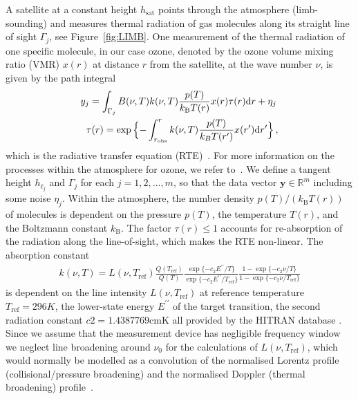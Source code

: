 A satellite at a constant height $h_{\text{sat}}$ points through the atmosphere (limb-sounding) and measures thermal radiation of gas molecules along its straight line of sight $\Gamma_j$, see  Figure~\ref{fig:LIMB}.
One measurement of the thermal radiation of one specific molecule, in our case ozone, denoted by the ozone volume mixing ratio (VMR) $x(r)$ at distance $r$ from the satellite, at the wave number $\nu$, is given by the path integral
\begin{align}
	\label{eq:RTE} 
	y_j =   \int_{\Gamma_j}  B(\nu,T) k(\nu, T)   \frac{p(T)}{k_{\text{B}} T(r)}  x(r)  \tau(r) \text{d}r + \eta_j \, \\
	\tau(r) = \exp{ \Bigl\{ - \int^{r}_{r_\text{obs}}  k(\nu, T)   \frac{p(T)}{k_B T(r^{\prime})}  x(r^{\prime}) \text{d}r^{\prime} \Bigr\} } \, ,\label{eq:absRTE} 
\end{align}
which is the radiative transfer equation (RTE)~\cite{mipas2000handbook}.
For more information on the processes within the atmosphere for ozone, we refer to~\cite{Lee2020NightOzone}.
We define a tangent height $h_{\ell_j}$ and $\Gamma_j$ for each $j=1,2,\ldots,m$, so that the data vector $\bm{y} \in \mathbb{R}^m$ including some noise $\eta_j$.
Within the atmosphere, the number density $p(T) / (k_{\text{B}} T(r))$ of molecules is dependent on the pressure $p(T)$, the temperature $T(r)$, and the Boltzmann constant $k_{\text{B}}$.
The factor $\tau(r)\leq 1$ accounts for re-absorption of the radiation along the line-of-sight, which makes the RTE non-linear.
The absorption constant
\begin{align}
	k(\nu, T) = L(\nu, T_{\text{ref}}) \frac{Q(T_{\text{ref}})}{Q(T)} \frac{ \exp{\{ - c_2 E^{\prime \prime} / T\}} }{\exp{\{ - c_2 E^{\prime \prime} / T_{\text{ref}} \}}} \frac{ 1- \exp{\{ - c_2 \nu  / T \}} }{1 - \exp{\{ - c_2 \nu / T_{\text{ref}} \}}}
\end{align}
is dependent on the line intensity $L(\nu, T_{\text{ref}})$ at reference temperature $T_{\text{ref}} =296K $, the lower-state energy $ E^{\prime \prime} $ of the target transition, the second radiation constant $c2=1.4387769\text{cmK}$ all provided by the HITRAN database \cite{gordon2022hitran2020}.
Since we assume that the measurement device has negligible frequency window we neglect line broadening around $\nu_0$ for the calculations of $L(\nu, T_{\text{ref}})$, which would normally be modelled as a convolution of the normalised Lorentz profile (collisional/pressure broadening) and the normalised Doppler (thermal broadening) profile~\cite{mipas2000handbook}.
